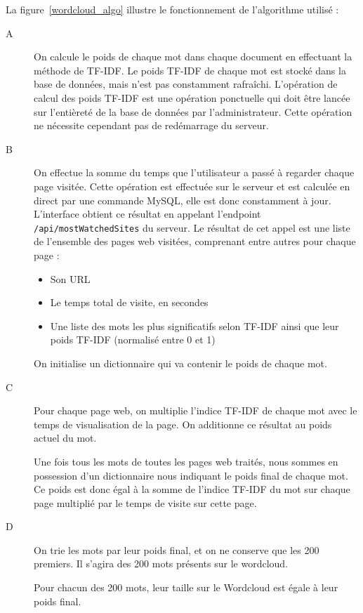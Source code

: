 		La figure~\ref{wordcloud_algo} illustre le fonctionnement de l'algorithme utilisé :
		\begin{description}
			\item[A] On calcule le poids de chaque mot dans chaque document en effectuant la méthode de TF-IDF. Le poids TF-IDF de chaque mot est stocké dans la base de données, mais n'est pas constamment rafraîchi. L'opération de calcul des poids TF-IDF est une opération ponctuelle qui doit être lancée sur l'entièreté de la base de données par l'administrateur. Cette opération ne nécessite cependant pas de redémarrage du serveur.

			\item[B] On effectue la somme du temps que l'utilisateur a passé à regarder chaque page visitée. Cette opération est effectuée sur le serveur et est calculée en direct par une commande MySQL, elle est donc constamment à jour. L'interface obtient ce résultat en appelant l'endpoint \texttt{/api/mostWatchedSites} du serveur. Le résultat de cet appel est une liste de l'ensemble des pages web visitées, comprenant entre autres pour chaque page : 
			\begin{itemize}
				\item Son URL
				\item Le temps total de visite, en secondes
				\item Une liste des mots les plus significatifs selon TF-IDF ainsi que leur poids TF-IDF (normalisé entre 0 et 1)
			\end{itemize}
			
			On initialise un dictionnaire qui va contenir le poids de chaque mot.

			\item[C] Pour chaque page web, on multiplie l'indice TF-IDF de chaque mot avec le temps de visualisation de la page. On additionne ce résultat au poids actuel du mot.
			
			Une fois tous les mots de toutes les pages web traités, nous sommes en possession d'un dictionnaire nous indiquant le poids final de chaque mot. Ce poids est donc égal à la somme de l'indice TF-IDF du mot sur chaque page multiplié par le temps de visite sur cette page.
			
			\item[D] On trie les mots par leur poids final, et on ne conserve que les 200 premiers. Il s'agira des 200 mots présents sur le wordcloud.
			
			Pour chacun des 200 mots, leur taille sur le Wordcloud est égale à leur poids final.
		\end{description}

